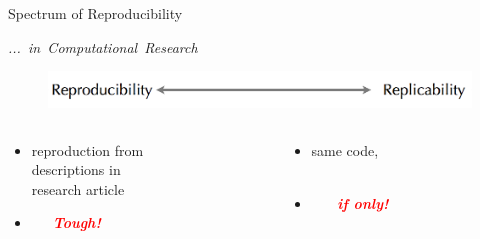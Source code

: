 \documentclass[xcolor=svgnames,11pt]{beamer}
\begin{document}
\begin{frame}{Spectrum of Reproducibility}

\begin{flushright}
  \Large\mbox{\textit{... in Computational Research}}
\end{flushright}
\vspace{0.3cm} \normalsize

\begin{figure}

\includegraphics[width=1.0\textwidth]{reproducibility_spectrum_clean.png}
\end{figure}

\large
\begin{columns}[t]
  \begin{column}[t]{0.4\textwidth} 
    \begin{itemize}
      \item[] reproduction from\\ descriptions in\\ research article
    \end{itemize}
    \vspace{0.2cm}

    \begin{itemize}
      \item[] \textcolor{white}{-----}\Large\textcolor{red}{\textbf{\emph{Tough!}}}
    \end{itemize}

    \large
   
  \end{column}
  \hfill
  \begin{column}[t]{0.45\textwidth} 
    \begin{itemize}
      \item[] same code,\\ 
        \textcolor{white}{-----}\\ 
    \end{itemize}
    \vspace{0.2cm}

    \begin{itemize}
      \item[]  \textcolor{white}{-----} 
          \textcolor{red}{\textbf{\emph{if only!}}}
    \end{itemize}

  \end{column}
\end{columns}

\vspace{1cm}

\end{frame}
\end{document}
